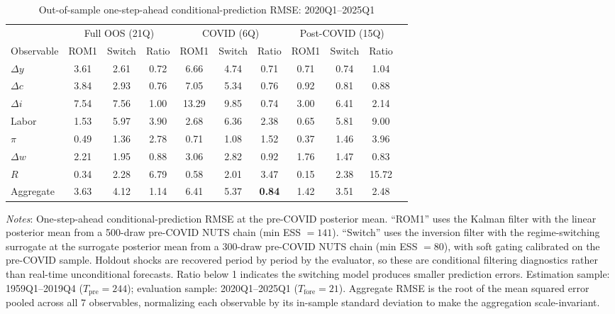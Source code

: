 \documentclass[12pt]{article}
\theoremstyle{plain}
\theoremstyle{definition}
\theoremstyle{remark}
\newcommand{\tablenotes}[1]{%
  \par\vspace{0.5em}%
  \noindent\begin{minipage}{\textwidth}%
  \raggedright\footnotesize #1%
  \end{minipage}\par%
}
\begin{document}
\begin{table}[htbp]
\centering
\caption{Out-of-sample one-step-ahead conditional-prediction RMSE: 2020Q1--2025Q1}
\label{tab:oos_forecast}
\small
\begin{tabular}{lcccccccccc}
\toprule
& \multicolumn{3}{c}{Full OOS (21Q)} & \multicolumn{3}{c}{COVID (6Q)} & \multicolumn{3}{c}{Post-COVID (15Q)} \\
\cmidrule(lr){2-4} \cmidrule(lr){5-7} \cmidrule(lr){8-10}
Observable & ROM1 & Switch & Ratio & ROM1 & Switch & Ratio & ROM1 & Switch & Ratio \\
\midrule
$\Delta y$   & 3.61 & 2.61 & 0.72 & 6.66 & 4.74 & 0.71 & 0.71 & 0.74 & 1.04 \\
$\Delta c$   & 3.84 & 2.93 & 0.76 & 7.05 & 5.34 & 0.76 & 0.92 & 0.81 & 0.88 \\
$\Delta i$   & 7.54 & 7.56 & 1.00 & 13.29 & 9.85 & 0.74 & 3.00 & 6.41 & 2.14 \\
Labor        & 1.53 & 5.97 & 3.90 & 2.68 & 6.36 & 2.38 & 0.65 & 5.81 & 9.00 \\
$\pi$        & 0.49 & 1.36 & 2.78 & 0.71 & 1.08 & 1.52 & 0.37 & 1.46 & 3.96 \\
$\Delta w$   & 2.21 & 1.95 & 0.88 & 3.06 & 2.82 & 0.92 & 1.76 & 1.47 & 0.83 \\
$R$          & 0.34 & 2.28 & 6.79 & 0.58 & 2.01 & 3.47 & 0.15 & 2.38 & 15.72 \\
\midrule
Aggregate    & 3.63 & 4.12 & 1.14 & 6.41 & 5.37 & \textbf{0.84} & 1.42 & 3.51 & 2.48 \\
\bottomrule
\end{tabular}
\smallskip
\tablenotes{\textit{Notes}: One-step-ahead conditional-prediction RMSE at the pre-COVID posterior mean. ``ROM1'' uses the Kalman filter with the linear posterior mean from a 500-draw pre-COVID NUTS chain (min ESS $= 141$). ``Switch'' uses the inversion filter with the regime-switching surrogate at the surrogate posterior mean from a 300-draw pre-COVID NUTS chain (min ESS $= 80$), with soft gating calibrated on the pre-COVID sample. Holdout shocks are recovered period by period by the evaluator, so these are conditional filtering diagnostics rather than real-time unconditional forecasts. Ratio below 1 indicates the switching model produces smaller prediction errors. Estimation sample: 1959Q1--2019Q4 ($T_{\text{pre}} = 244$); evaluation sample: 2020Q1--2025Q1 ($T_{\text{fore}} = 21$). Aggregate RMSE is the root of the mean squared error pooled across all 7 observables, normalizing each observable by its in-sample standard deviation to make the aggregation scale-invariant.}
\end{table}
\end{document}
